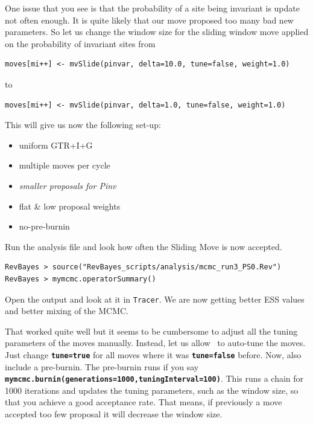 \documentclass[11pt]{article}
\newcommand{\cl}[1]{{\texttt{\textbf{#1}}}}
\begin{document}
One issue that you see is that the probability of a site being invariant is update not often enough.
It is quite likely that our move proposed too many bad new parameters.
So let us change the window size for the sliding window move applied on the probability of invariant sites from
{\tt \begin{snugshade*}
\begin{lstlisting}
moves[mi++] <- mvSlide(pinvar, delta=10.0, tune=false, weight=1.0)
\end{lstlisting}
\end{snugshade*}}
to
{\tt \begin{snugshade*}
\begin{lstlisting}
moves[mi++] <- mvSlide(pinvar, delta=1.0, tune=false, weight=1.0)
\end{lstlisting}
\end{snugshade*}}
This will give us now the following set-up:
\begin{itemize}
\item{uniform GTR+I+G}
\item{multiple moves per cycle}
\item{\it smaller proposals for Pinv}
\item{flat \& low proposal weights}
\item{no-pre-burnin}
\end{itemize}
Run the analysis file and look how often the Sliding Move is now accepted.
{\tt \begin{snugshade*}
\begin{lstlisting}
RevBayes > source("RevBayes_scripts/analysis/mcmc_run3_PS0.Rev")
RevBayes > mymcmc.operatorSummary()
\end{lstlisting}
\end{snugshade*}}
Open the output and look at it in \verb!Tracer!.
We are now getting better ESS values and better mixing of the MCMC.

That worked quite well but it seems to be cumbersome to adjust all the tuning parameters of the moves manually.
Instead, let us allow \RevBayes~to auto-tune the moves.
Just change \cl{tune=true} for all moves where it was \cl{tune=false} before.
Now, also include a pre-burnin.
The pre-burnin runs if you say \cl{mymcmc.burnin(generations=1000,tuningInterval=100)}.
This runs a chain for 1000 iterations and updates the tuning parameters, such as the window size, so that you achieve a good acceptance rate.
That means, if previously a move accepted too few proposal it will decrease the window size.
\end{document}
